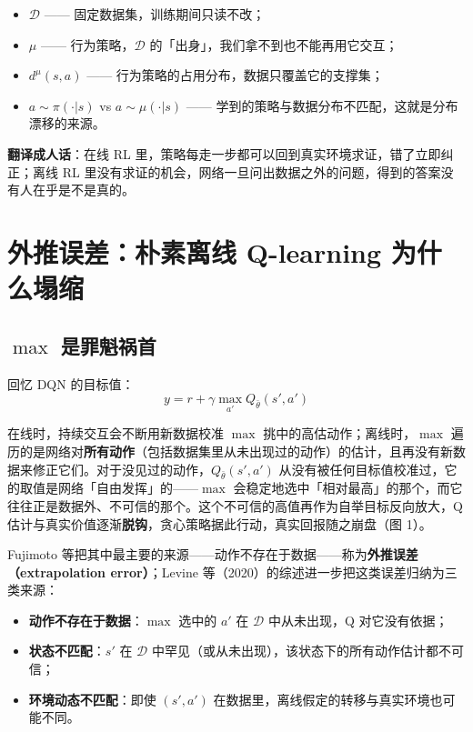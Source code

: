 \documentclass{article}
\begin{document}
\begin{itemize}
  \item $\mathcal{D}$ —— 固定数据集，训练期间只读不改；
  \item $\mu$ —— 行为策略，$\mathcal{D}$ 的「出身」，我们拿不到也不能再用它交互；
  \item $d^\mu(s,a)$ —— 行为策略的占用分布，数据只覆盖它的支撑集；
  \item $a\sim\pi(\cdot|s)$ vs $a\sim\mu(\cdot|s)$ —— 学到的策略与数据分布不匹配，这就是分布漂移的来源。
\end{itemize}

\textbf{翻译成人话}：在线 RL 里，策略每走一步都可以回到真实环境求证，错了立即纠正；离线 RL 里没有求证的机会，网络一旦问出数据之外的问题，得到的答案没有人在乎是不是真的。

\section*{外推误差：朴素离线 Q-learning 为什么塌缩}

\subsection*{$\max$ 是罪魁祸首}

回忆 DQN 的目标值：
\[
y = r + \gamma \max_{a'} Q_{\bar\theta}(s', a')
\]

在线时，持续交互会不断用新数据校准 $\max$ 挑中的高估动作；离线时，$\max$ 遍历的是网络对\textbf{所有动作}（包括数据集里从未出现过的动作）的估计，且再没有新数据来修正它们。对于没见过的动作，$Q_{\bar\theta}(s',a')$ 从没有被任何目标值校准过，它的取值是网络「自由发挥」的——$\max$ 会稳定地选中「相对最高」的那个，而它往往正是数据外、不可信的那个。这个不可信的高值再作为自举目标反向放大，Q 估计与真实价值逐渐\textbf{脱钩}，贪心策略据此行动，真实回报随之崩盘（图 1）。

Fujimoto 等把其中最主要的来源——动作不存在于数据——称为\textbf{外推误差（extrapolation error）}；Levine 等（2020）的综述进一步把这类误差归纳为三类来源：

\begin{itemize}
  \item \textbf{动作不存在于数据}：$\max$ 选中的 $a'$ 在 $\mathcal{D}$ 中从未出现，Q 对它没有依据；
  \item \textbf{状态不匹配}：$s'$ 在 $\mathcal{D}$ 中罕见（或从未出现），该状态下的所有动作估计都不可信；
  \item \textbf{环境动态不匹配}：即使 $(s',a')$ 在数据里，离线假定的转移与真实环境也可能不同。
\end{itemize}
\end{document}
